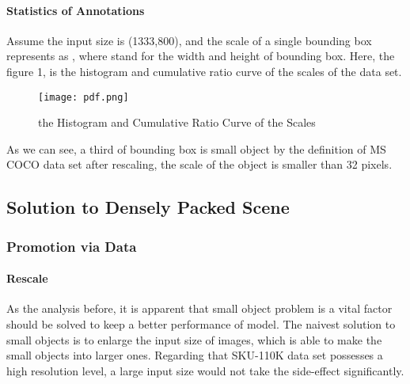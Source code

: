 \documentclass{article}
\begin{document}
\paragraph{Statistics of Annotations} Assume the input size is (1333,800), and the scale of a single bounding box represents as , where  stand for the width and height of bounding box. Here, the figure 1, is the histogram and cumulative ratio curve of the scales of the data set.
\begin{figure}[htb]
    \centering
    \texttt{[image: pdf.png]}
    \caption{the Histogram and Cumulative Ratio Curve of the Scales}
    \label{fig:my_label}
\end{figure}

\par As we can see, a third of bounding box is small object by the definition of MS COCO data set\cite{coco} after rescaling, the scale of the object is smaller than 32 pixels.
\subsection{Solution to Densely Packed Scene}
\subsubsection{Promotion via Data}
\paragraph{Rescale}As the analysis before, it is apparent that small object problem is a vital factor should be solved to keep a better performance of model. The naivest solution to small objects is to enlarge the input size of images, which is able to make the small objects into larger ones. Regarding that SKU-110K data set possesses a high resolution level, a large input size would not take the side-effect significantly.
\end{document}
